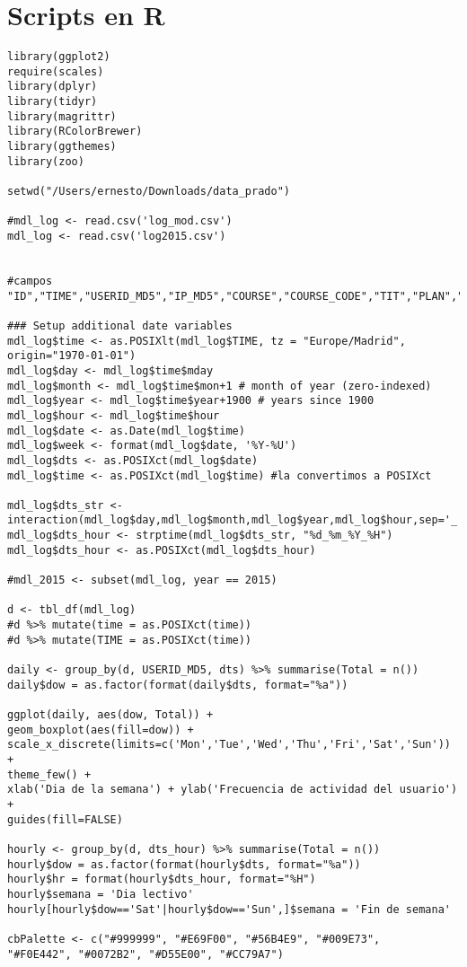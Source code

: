 \section{Scripts en R}
\begin{lstlisting}
library(ggplot2)
require(scales)
library(dplyr)
library(tidyr)
library(magrittr)
library(RColorBrewer)
library(ggthemes)
library(zoo)

setwd("/Users/ernesto/Downloads/data_prado")

#mdl_log <- read.csv('log_mod.csv')
mdl_log <- read.csv('log2015.csv')


#campos "ID","TIME","USERID_MD5","IP_MD5","COURSE","COURSE_CODE","TIT","PLAN","CEA","MODULE","CMID","ACTION","URL","INFO"

### Setup additional date variables
mdl_log$time <- as.POSIXlt(mdl_log$TIME, tz = "Europe/Madrid", origin="1970-01-01")
mdl_log$day <- mdl_log$time$mday
mdl_log$month <- mdl_log$time$mon+1 # month of year (zero-indexed)
mdl_log$year <- mdl_log$time$year+1900 # years since 1900
mdl_log$hour <- mdl_log$time$hour
mdl_log$date <- as.Date(mdl_log$time)
mdl_log$week <- format(mdl_log$date, '%Y-%U')
mdl_log$dts <- as.POSIXct(mdl_log$date)
mdl_log$time <- as.POSIXct(mdl_log$time) #la convertimos a POSIXct

mdl_log$dts_str <- interaction(mdl_log$day,mdl_log$month,mdl_log$year,mdl_log$hour,sep='_')
mdl_log$dts_hour <- strptime(mdl_log$dts_str, "%d_%m_%Y_%H")
mdl_log$dts_hour <- as.POSIXct(mdl_log$dts_hour)

#mdl_2015 <- subset(mdl_log, year == 2015)

d <- tbl_df(mdl_log)
#d %>% mutate(time = as.POSIXct(time))
#d %>% mutate(TIME = as.POSIXct(time))

daily <- group_by(d, USERID_MD5, dts) %>% summarise(Total = n())
daily$dow = as.factor(format(daily$dts, format="%a"))

ggplot(daily, aes(dow, Total)) +
geom_boxplot(aes(fill=dow)) +
scale_x_discrete(limits=c('Mon','Tue','Wed','Thu','Fri','Sat','Sun')) +
theme_few() +
xlab('Dia de la semana') + ylab('Frecuencia de actividad del usuario') +
guides(fill=FALSE)

hourly <- group_by(d, dts_hour) %>% summarise(Total = n())
hourly$dow = as.factor(format(hourly$dts, format="%a"))
hourly$hr = format(hourly$dts_hour, format="%H")
hourly$semana = 'Dia lectivo'
hourly[hourly$dow=='Sat'|hourly$dow=='Sun',]$semana = 'Fin de semana'

cbPalette <- c("#999999", "#E69F00", "#56B4E9", "#009E73",
"#F0E442", "#0072B2", "#D55E00", "#CC79A7")


\end{lstlisting}
